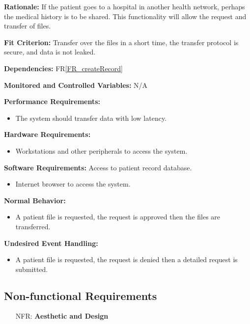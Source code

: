 \documentclass[12pt]{article}
\newcounter{nfrnum} %
\begin{document}
\begin{itemize}
\textbf{Rationale:} If the patient goes to a hospital in another health network, perhaps the medical history is to be shared. This functionality will allow the request and transfer of files.

\textbf{Fit Criterion:} Transfer over the files in a short time, the transfer protocol is secure, and data is not leaked.

\textbf{Dependencies:} FR\ref{FR_createRecord}

\textbf{Monitored and Controlled Variables:} N/A

\textbf{Performance Requirements:}
\begin{itemize}
  \item The system should transfer data with low latency.
\end{itemize}

\textbf{Hardware Requirements:} 
\begin{itemize}
  \item Workstations and other peripherals to access the system.
\end{itemize}

\textbf{Software Requirements:}
Access to patient record database.
\begin{itemize}
  \item Internet browser to access the system. 
\end{itemize}

\textbf{Normal Behavior:}
\begin{itemize}
  \item A patient file is requested, the request is approved then the files are transferred.
\end{itemize}

\textbf{Undesired Event Handling:}
\begin{itemize}
  \item A patient file is requested, the request is denied then a detailed request is submitted.
\end{itemize}



\subsection{Non-functional Requirements} \label{sec_NonFunctionalRequirements}

\noindent \begin{itemize}

\item[NFR\refstepcounter{nfrnum}\thenfrnum \label{NFR_LookAndFeel}:] \textbf{Aesthetic and Design}


\end{itemize}
\end{itemize}
\end{document}
